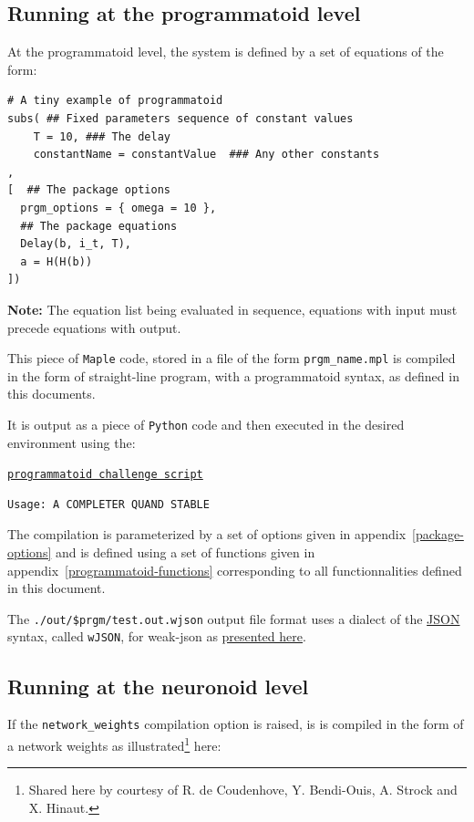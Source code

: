 \documentclass[a4]{article} \usepackage[left=2cm,right=3cm,top=1cm,bottom=2cm]{geometry}
\begin{document}
\subsection{Running at the programmatoid level}

At the programmatoid level, the system is defined by a set of equations of the form: \begin{verbatim}
# A tiny example of programmatoid
subs( ## Fixed parameters sequence of constant values
    T = 10, ### The delay
    constantName = constantValue  ### Any other constants
,
[  ## The package options 
  prgm_options = { omega = 10 },
  ## The package equations
  Delay(b, i_t, T),
  a = H(H(b))
])\end{verbatim}

{\bf Note:} The equation list being evaluated in sequence, equations with input must precede equations with output.

This piece of {\tt Maple} code, stored in a file of the form {\tt prgm\_name.mpl} is compiled in the form of straight-line program, with a programmatoid syntax, as defined in this documents.

It is output as a piece of {\tt Python} code and then executed in the desired environment using the:
\begin{center}\href{https://github.com/vthierry/braincraft/blob/master/braincraft/programmatoid_challenge.sh}{\tt programmatoid challenge script}\end{center}
\begin{verbatim}
Usage: A COMPLETER QUAND STABLE
\end{verbatim}

The compilation is parameterized by a set of options given in appendix~\ref{package-options} and is defined using a set of functions given in appendix~\ref{programmatoid-functions} corresponding to all functionnalities defined in this document.

The {\tt ./out/\$prgm/test.out.wjson} output file format uses a dialect of the \href{https://www.json.org/json-en.html}{JSON} syntax, called {\tt wJSON}, for weak-json as \href{https://line.gitlabpages.inria.fr/aide-group/wjson/}{presented here}.

\subsection{Running at the neuronoid level}

If the {\tt network\_weights} compilation option is raised, is is compiled in the form of a network weights as illustrated\footnote{Shared here by courtesy of R. de Coudenhove, Y. Bendi-Ouis, A. Strock and X. Hinaut.} here:
\end{document}
